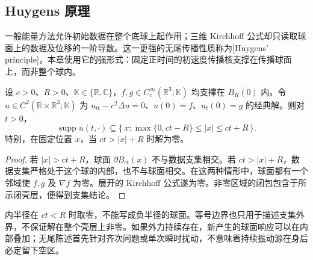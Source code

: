 \subsection{Huygens 原理}
\label{b2:subsec:110203}

一般能量方法允许初始数据在整个底球上起作用；三维 Kirchhoff 公式却只读取球面上的数据及位移的一阶导数。这一更强的无尾传播性质称为[Huygens' principle]，本章使用它的强形式：固定正时间的初速度传播核支撑在传播球面上，而非整个球内。

\begin{corollary}[三维无尾传播]\label{b2:cor:11-huygens}
设 \(c>0\)、\(R>0\)、\(\mathbb K\in\{\mathbb R,\mathbb C\}\)，\(f,g\in C_c^\infty(\mathbb R^3;\mathbb K)\) 均支撑在 \(\overline{B_R(0)}\) 内。令 \(u\in C^2(\mathbb R\times\mathbb R^3;\mathbb K)\) 为 \(u_{tt}-c^2\Delta u=0\)、\(u(0)=f\)、\(u_t(0)=g\) 的经典解。则对 \(t>0\)，
\begin{equation}\label{b2:eq:11-shell}
 \operatorname{supp}u(t,\cdot)\subseteq
 \{\,x:\max\{0,ct-R\}\leq |x|\leq ct+R\,\}.
\end{equation}
特别，在固定位置 \(x\)，当 \(ct>|x|+R\) 时解为零。
\end{corollary}
\begin{proof}
若 \(|x|>ct+R\)，球面 \(\partial B_{ct}(x)\) 不与数据支集相交。若 \(ct>|x|+R\)，数据支集严格处于这个球的内部，也不与球面相交。在这两种情形中，球面都有一个邻域使 \(f,g\) 及 \(\nabla f\) 为零。展开的 Kirchhoff 公式遂为零。非零区域的闭包包含于所示闭壳层，便得到支集结论。
\end{proof}

内半径在 \(ct<R\) 时取零，不能写成负半径的球面。等号边界也只用于描述支集外界，不保证解在整个壳层上非零。如果外力持续存在，新产生的球面响应可以在内部叠加；无尾陈述首先针对齐次问题或单次瞬时扰动，不意味着持续振动源在身后必定留下空区。

